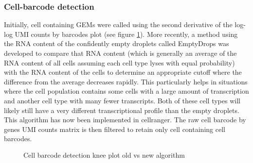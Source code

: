 \subsubsection{Cell-barcode detection}
\par{
Initially, cell containing GEMs were called using the second derivative of the log-log UMI counts by barcodes plot (see figure \ref{figure:knee}). More recently, a method using the RNA content of the confidently empty droplets called EmptyDrops\cite{emptydrops} was developed to compare that RNA content (which is generally an average of the RNA content of all cells assuming each cell type lyses with equal probability) with the RNA content of the cells to determine an appropriate cutoff where the difference from the average decreases rapidly. This particularly helps in situations where the cell population contains some cells with a large amount of transcription and another cell type with many fewer transcripts. Both of these cell types will likely still have a very different transcriptional profile than the empty droplets. This algorithm has now been implemented in cellranger. The raw cell barcode by genes UMI counts matrix is then filtered to retain only cell containing cell barcodes.
}
\begin{figure}[htbp!]
\caption{Cell barcode detection knee plot old vs new algorithm}
\label{figure:knee}
\begin{centering}
\end{centering}
\end{figure}

